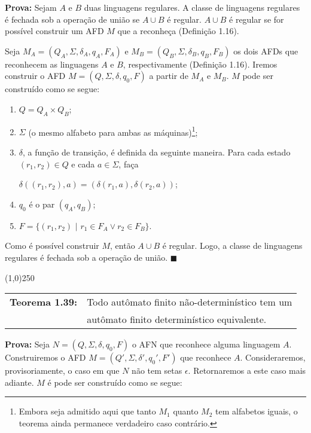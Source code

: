 \documentclass[12pt,a4paper,oneside]{article}
\begin{document}
{\bf Prova:} Sejam $A$ e $B$ duas linguagens regulares. A classe de linguagens regulares é fechada sob a operação de união se $A \cup B$ é regular. $A \cup B$ é regular se for possível construir um AFD $M$ que a reconheça (Definição 1.16).

Seja $M_A = ( Q_A, \Sigma, \delta_A, q_A, F_A )$ e $M_B = ( Q_B, \Sigma, \delta_B, q_B, F_B )$ os dois AFDs que reconhecem as linguagens $A$ e $B$, respectivamente (Definição 1.16). Iremos construir o AFD $M = ( Q, \Sigma, \delta, q_0, F )$ a partir de $M_A$ e $M_B$. $M$ pode ser construído como se segue:

\begin{enumerate}
	\item $Q = Q_A \times Q_B$;
	\item $\Sigma$ (o mesmo alfabeto para ambas as máquinas)\footnote{Embora seja admitido aqui que tanto $M_1$ quanto $M_2$ tem alfabetos iguais, o teorema ainda permanece verdadeiro caso contrário.};
	\item $\delta$, a função de transição, é definida da seguinte maneira. Para cada estado $(r_1,r_2) \in Q$ e cada $a \in \Sigma$, faça
		\begin{center}
			$\delta( (r_1, r_2), a ) = (\delta(r_1,a), \delta(r_2,a)) $;
		\end{center}
	\item $q_0$ é o par $(q_A, q_B)$;
	\item $F = \{ (r_1, r_2) \mbox{ | } r_1 \in F_A \vee r_2 \in F_B \}$.
\end{enumerate}

Como é possível construir $M$, então $A \cup B$ é regular. Logo, a classe de linguagens regulares é fechada sob a operação de união. $\blacksquare$

\begin{center}
\line(1,0){250}
\end{center}

\begin{flushleft}
	\begin{tabular}{ll}
		{\bf Teorema 1.39:} & Todo autômato finito não-determinístico tem um \\
							& autômato finito determinístico equivalente.
	\end{tabular}
\end{flushleft}

{\bf Prova:} Seja $N = (Q, \Sigma, \delta, q_0, F)$ o AFN que reconhece alguma linguagem $A$. Construiremos o AFD $M = (Q', \Sigma, \delta', q_0', F' )$ que reconhece $A$. Consideraremos, provisoriamente, o caso em que $N$ não tem setas $\epsilon$. Retornaremos a este caso mais adiante. $M$ é pode ser construído como se segue:
\end{document}
